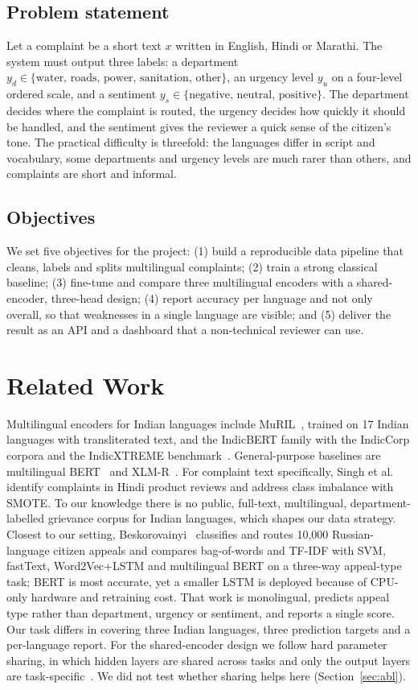 \documentclass[conference]{IEEEtran}
\begin{document}
\subsection{Problem statement}
Let a complaint be a short text $x$ written in English, Hindi or Marathi. The system must output three labels: a department $y_d \in \{\text{water, roads, power, sanitation, other}\}$,
an urgency level $y_u$ on a four-level ordered scale, and a sentiment $y_s \in \{\text{negative, neutral, positive}\}$. The department decides where the complaint is routed,
the urgency decides how quickly it should be handled, and the sentiment gives the reviewer a quick sense of the citizen's tone.
The practical difficulty is threefold: the languages differ in script and vocabulary, some departments and urgency levels are much rarer than others, and complaints are short and informal.
\subsection{Objectives}
We set five objectives for the project: (1) build a reproducible data pipeline that cleans, labels and splits multilingual complaints; (2) train a strong classical baseline;
(3) fine-tune and compare three multilingual encoders with a shared-encoder, three-head design; (4) report accuracy per language and not only overall, so that weaknesses in a single language are visible;
and (5) deliver the result as an API and a dashboard that a non-technical reviewer can use.

\section{Related Work}
Multilingual encoders for Indian languages include MuRIL~\cite{khanuja2021muril}, trained on 17 Indian languages with transliterated text, and the
IndicBERT family with the IndicCorp corpora and the IndicXTREME benchmark~\cite{kakwani2020indicnlp,doddapaneni2023towards}.
General-purpose baselines are multilingual BERT~\cite{devlin2019bert} and XLM-R~\cite{conneau2020xlmr}.
For complaint text specifically, Singh et al.~\cite{singh2020complaints} identify complaints in Hindi product reviews and address class imbalance
with SMOTE. To our knowledge there is no public, full-text, multilingual, department-labelled grievance corpus for Indian languages, which shapes our data strategy.
Closest to our setting, Beskorovainyi~\cite{beskorovainyi2026appeals} classifies and routes 10{,}000 Russian-language citizen appeals and compares bag-of-words and TF-IDF with SVM, fastText, Word2Vec+LSTM and multilingual BERT on a three-way appeal-type task; BERT is most accurate, yet a smaller LSTM is deployed because of CPU-only hardware and retraining cost. That work is monolingual, predicts appeal type rather than department, urgency or sentiment, and reports a single score.
Our task differs in covering three Indian languages, three prediction targets and a per-language report.
For the shared-encoder design we follow hard parameter sharing, in which hidden layers are shared across tasks and only the output layers are task-specific~\cite{caruana1997multitask,ruder2017overview}.
We did not test whether sharing helps here (Section~\ref{sec:abl}).
\end{document}
